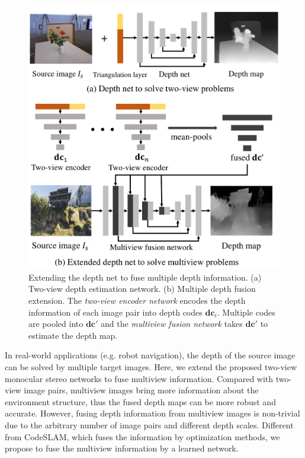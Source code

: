 \documentclass[letterpaper, 10 pt, conference]{ieeeconf}  %
\begin{document}
\begin{figure}[t]
\begin{center}
\includegraphics[width=0.9\linewidth]{figs/multiview_support.pdf}
\end{center}
\vspace{-0.3cm}
\caption{Extending the depth net to fuse multiple depth information. (a) Two-view depth estimation network. (b) Multiple depth fusion extension. The \textit{two-view encoder network} encodes the depth information of each image pair into depth codes $\mathbf{dc}_i$. Multiple codes are pooled into $\mathbf{dc}'$ and the \textit{multiview fusion network} takes $\mathbf{dc}'$ to estimate the depth map.}
\label{fig:multiview_support}
\vspace{-0.5cm}
\end{figure}
 
In real-world applications (e.g. robot navigation), the depth of the source image can be solved by multiple target images. Here, we extend the proposed two-view monocular stereo networks to fuse multiview information. Compared with two-view image pairs, multiview images bring more information about the environment structure, thus the fused depth maps can be more robust and accurate. However, fusing depth information from multiview images is non-trivial due to the arbitrary number of image pairs and different depth scales. Different from CodeSLAM, which fuses the information by optimization methods, we propose to fuse the multiview information by a learned network.
 
\end{document}
